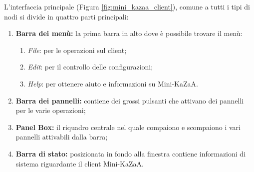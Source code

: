 L'interfaccia principale (Figura \ref{fig:mini_kazaa_client}), comune a tutti i tipi di nodi si divide in quattro parti principali:
\begin{enumerate}
 \item \textbf{Barra dei menù:}
la prima barra in alto dove è possibile trovare il menù:
	\begin{enumerate}
		\item \textit{File}: per le operazioni sul client;
		\item \textit{Edit}: per il controllo delle configurazioni;
		\item \textit{Help}: per ottenere aiuto e informazioni su Mini-KaZaA.
	\end{enumerate}

 \item \textbf{Barra dei pannelli:}
contiene dei grossi pulsanti che attivano dei pannelli per le varie operazioni;

 \item \textbf{Panel Box:}
il riquadro centrale nel quale compaiono e scompaiono i vari pannelli attivabili dalla barra;

 \item \textbf{Barra di stato:}
posizionata in fondo alla finestra contiene informazioni di sistema riguardante il client Mini-KaZaA.
\end{enumerate}

